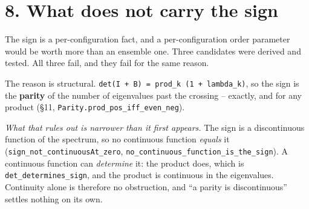 \documentclass[10pt,letterpaper,twocolumn]{article}
\begin{document}
\section{8. What does not carry the sign}\label{8-what-does-not-carry-the-sign}

The sign is a per-configuration fact, and a per-configuration order parameter would be worth more
than an ensemble one. Three candidates were derived and tested. All three fail, and they fail for
the same reason.


The reason is structural. \texttt{det(\allowbreak{}I\ +\allowbreak{}\ B)\allowbreak{}\ =\allowbreak{}\ prod\_\allowbreak{}k\ (\allowbreak{}1\ +\allowbreak{}\ lambda\_\allowbreak{}k)\allowbreak{}}, so the sign is the \textbf{parity} of the
number of eigenvalues past the crossing -- exactly, and for any product
(§11, \texttt{Parity.\allowbreak{}prod\_\allowbreak{}pos\_\allowbreak{}iff\_\allowbreak{}even\_\allowbreak{}neg}).

\emph{What that rules out is narrower than it first appears.} The sign is a discontinuous function of
the spectrum, so no continuous function \emph{equals} it (\texttt{sign\_\allowbreak{}not\_\allowbreak{}continuousAt\_\allowbreak{}zero},
\texttt{no\_\allowbreak{}continuous\_\allowbreak{}function\_\allowbreak{}is\_\allowbreak{}the\_\allowbreak{}sign}). A continuous function can \emph{determine} it: the product does,
which is \texttt{det\_\allowbreak{}determines\_\allowbreak{}sign}, and the product is continuous in the eigenvalues. Continuity alone
is therefore no obstruction, and ``a parity is discontinuous'' settles nothing on its own.
\end{document}
